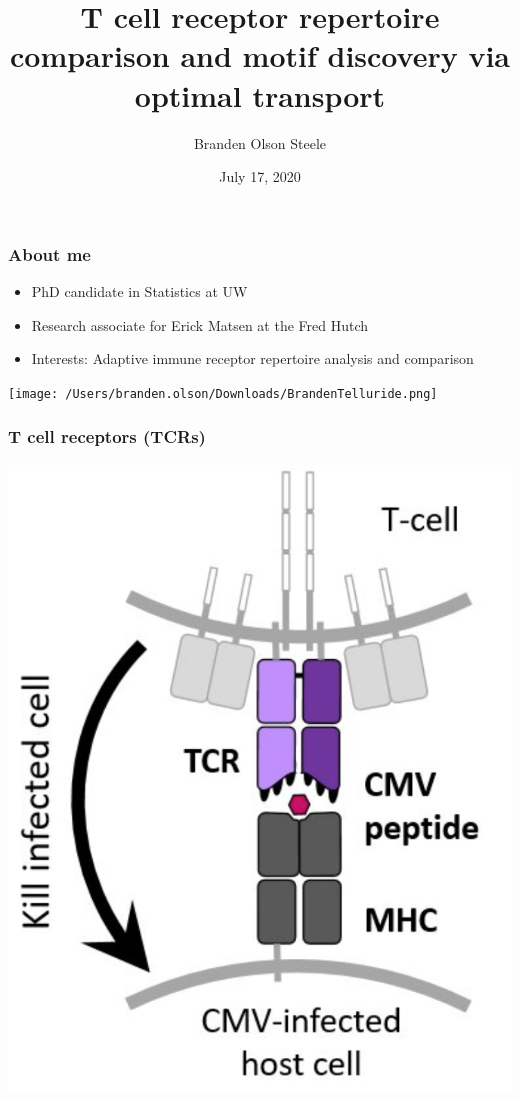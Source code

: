 \documentclass[mathserif,compress,xcolor={dvipsnames}]{beamer}
\title[]{T cell receptor repertoire comparison and motif discovery via optimal transport}
\author[]
{Branden Olson Steele}
\date[July 17, 2020]
{July 17, 2020}
\institute[]
{
Department of Computational Biology
\\
Fred Hutchinson Cancer Research Center
}
\renewcommand\;{\,}
\begin{document}
\begin{frame}[noframenumbering]
  \titlepage
\end{frame}

\begin{frame}\frametitle{About me}
\begin{minipage}{0.49\linewidth}
\begin{itemize}
\item PhD candidate in Statistics at UW
\bigskip
\item Research associate for Erick Matsen at the Fred Hutch
\bigskip
\item Interests: Adaptive immune receptor repertoire analysis and comparison
\end{itemize}
\end{minipage}
\begin{minipage}{0.45\linewidth}
\begin{center}
\texttt{[image: /Users/branden.olson/Downloads/BrandenTelluride.png]}
\end{center}
\end{minipage}
\end{frame}

\begin{frame}\frametitle{T cell receptors (TCRs)}
\begin{center}
\includegraphics[width=0.6\linewidth]{Images/TCR.png}
\end{center}
\end{frame}
\end{document}
